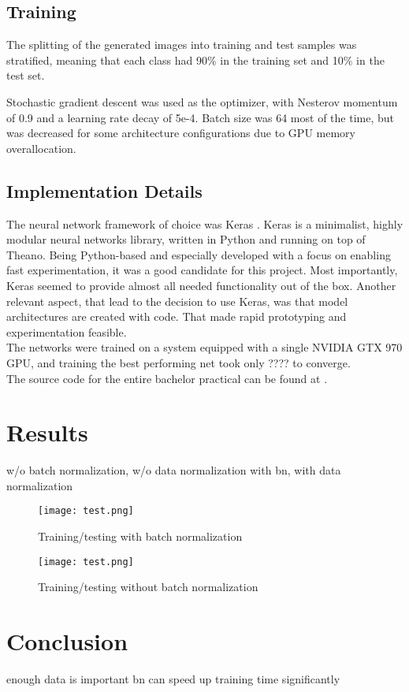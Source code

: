 \documentclass[a4paper, 11pt]{article}
\begin{document}
\subsection{Training}
The splitting of the generated images into training and test samples was stratified, meaning that each class had 90\% in the training set and 10\% in the test set.

Stochastic gradient descent was used as the optimizer, with Nesterov momentum of 0.9 and a learning rate decay of 5e-4.
Batch size was 64 most of the time, but was decreased for some architecture configurations due to GPU memory overallocation.

\subsection{Implementation Details}
The neural network framework of choice was Keras \cite{keras}.
Keras is a minimalist, highly modular neural networks library, written in Python and running on top of Theano.
Being Python-based and especially developed with a focus on enabling fast experimentation, it was a good candidate for this project.
Most importantly, Keras seemed to provide almost all needed functionality out of the box.
Another relevant aspect, that lead to the decision to use Keras, was that model architectures are created with code.
That made rapid prototyping and experimentation feasible.\\

The networks were trained on a system equipped with a single NVIDIA GTX 970 GPU, and training the best performing net took only ???? to converge.\\

The source code for the entire bachelor practical can be found at \cite{UnternaehrerCode}.

\section{Results}
w/o batch normalization, w/o data normalization
with bn, with data normalization

\begin{figure}[!h]
	\texttt{[image: test.png]}
	\caption{Training/testing with batch normalization}
	\label{fig:bn}
\end{figure}

\begin{figure}[!h]
	\texttt{[image: test.png]}
	\caption{Training/testing without batch normalization}
	\label{fig:no_bn}
\end{figure}

\section{Conclusion}
enough data is important
bn can speed up training time significantly


\clearpage

\end{document}
